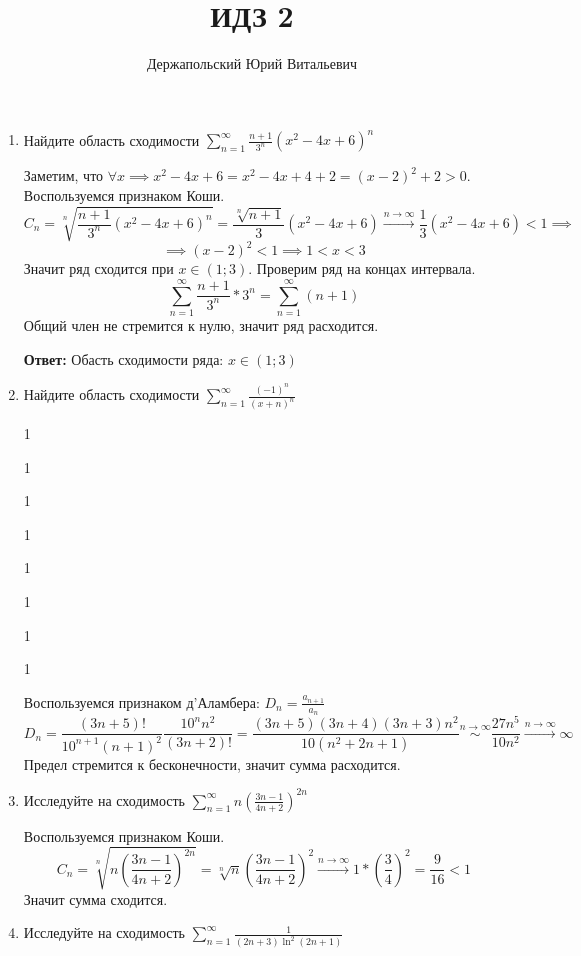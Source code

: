 \documentclass[10pt]{article} %
\title{ИДЗ 2}
\author{Держапольский Юрий Витальевич}
\date{} %
\begin{document}
 \begin{large}  
\maketitle


\begin{enumerate}
\item Найдите область сходимости $ \sum\limits_{n=1}^{\infty}\frac{n+1}{3^n}(x^2-4x+6)^n $

Заметим, что $\forall  x \implies x^2-4x+6 = x^2-4x+4+2 = (x-2)^2 + 2 > 0 $. Воспользуемся признаком Коши.
\[ C_{n} = \sqrt[n]{\frac{n+1}{3^n}(x^2-4x+6)^n  } = \frac{\sqrt[n]{n+1}}{3}(x^2-4x+6) \xrightarrow{n\to\infty} \frac{1}{3}(x^2-4x+6) < 1 \implies \]
\[ \implies (x-2)^2 < 1 \implies 1< x < 3 \]
Значит ряд сходится при $ x \in (1;3) $. Проверим ряд на концах интервала.
\[  \sum_{n=1}^{\infty}\frac{n+1}{3^n} * 3^n = \sum_{n=1}^{\infty}(n+1) \]
Общий член не стремится к нулю, значит ряд расходится.

\textbf{Ответ:} Обасть сходимости ряда: $ x \in (1;3) $

\item Найдите область сходимости $ \sum\limits_{n=1}^{\infty}\frac{(-1)^n}{(x+n)^n} $

1

1

1

1

1

1

1

1

Воспользуемся признаком д'Аламбера: $ D_{n} = \frac{a_{n+1}}{a_{n}}  $
\[  D_{n} =  \frac{(3n+5)!}{10^{n+1} (n+1)^2} \frac{10^n n^2}{(3n+2)!} = \frac{(3n+5)(3n+4)(3n+3)n^2}{10(n^2 + 2n+1) } \stackrel{n\to\infty}{\sim} 
\frac{27 n^5}{10 n^2 } \xrightarrow{n\to\infty} \infty \]
Предел стремится к бесконечности, значит сумма расходится.

\item Исследуйте на сходимость $ \sum\limits_{n=1}^{\infty}{n \left( \frac{3n-1}{4n+2} \right)^{2n} }$

Воспользуемся признаком Коши.
\[ C_{n} = \sqrt[n]{n \left( \frac{3n-1}{4n+2} \right)^{2n}} = \sqrt[n]{n}  \left( \frac{3n-1}{4n+2} \right)^2  \xrightarrow{n\to\infty} 1 * \left( \frac{3}{4}\right)^2 = \frac{9}{16} < 1 \]
Значит сумма сходится.

\item Исследуйте на сходимость $ \sum\limits_{n=1}^{\infty}{ \frac{1}{(2n+3)\ln^2{(2n+1)}} }$


\end{enumerate}
\end{large}
\end{document}
